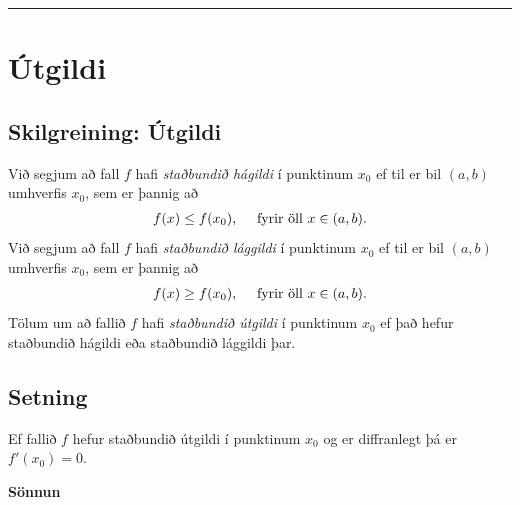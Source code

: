 \documentclass[a4paper,10pt,icelandic]{sphinxmanual}
\begin{document}
\bigskip\hrule{}\bigskip



\section{Útgildi}
\label{kafli03:id10}\label{kafli03:utgildi}

\subsection{Skilgreining: Útgildi}
\label{kafli03:skilgreining-utgildi}\label{kafli03:index-5}
Við segjum að fall \(f\) hafi \textit{staðbundið hágildi} í punktinum
\(x_0\) ef til er bil \((a,b)\) umhverfis \(x_0\), sem er
þannig að
\begin{gather}
\begin{split}f(x) \leq f(x_0), \quad \text{ fyrir öll } x \in (a,b).\end{split}\notag
\end{gather}
Við segjum að fall \(f\) hafi \textit{staðbundið lággildi} í punktinum
\(x_0\) ef til er bil \((a,b)\) umhverfis \(x_0\), sem er
þannig að
\begin{gather}
\begin{split}f(x) \geq f(x_0), \quad \text{ fyrir öll } x \in (a,b).\end{split}\notag
\end{gather}
Tölum um að fallið \(f\) hafi \textit{staðbundið útgildi} í punktinum
\(x_0\) ef það hefur staðbundið hágildi eða staðbundið lággildi þar.


\subsection{Setning}
\label{kafli03:setning-3-5-2}\label{kafli03:id11}
Ef fallið \(f\) hefur staðbundið útgildi í punktinum \(x_0\) og
er diffranlegt þá er \(f'(x_0)=0\).

\begin{DUlineblock}{0em}
\item[] 
\end{DUlineblock}

\textbf{Sönnun}
\end{document}
